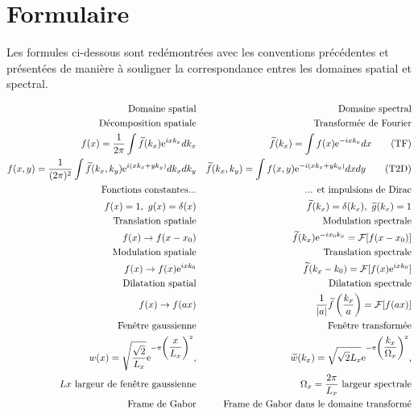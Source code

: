 \section{Formulaire}\label{formulaire}

Les formules ci-dessous sont redémontrées avec les conventions précédentes
et présentées de manière à souligner la correspondance entres les domaines spatial et spectral.
  
\begin{align}
\text{Domaine spatial}	&	&\text{Domaine spectral}
\nonumber\\
\text{Décomposition spatiale}	&	&	\text{Transformée de Fourier}
\nonumber\\
f(x) = \f[1]{2\pi}\Int\t{f}(k_x)\e^{ixk_x}dk_x	&	&	\t{f}(k_x) = \Int f(x)\e^{-ixk_x}dx
\tag{TF}\label{tf}\\
f(x,y) = \f[1]{(2\pi)^2}\Int\t{f}(k_x,k_y)\e^{i(xk_x+yk_y)}dk_xdk_y	&	&
\t{f}(k_x,k_y) = \Int f(x,y)\e^{-i(xk_x+yk_y)}dxdy
\tag{T2D}\label{tf2d}\\
\text{Fonctions constantes...}	&		&	\text{... et impulsions de Dirac}
\nonumber\\
f(x) = 1,\ g(x) = \delta(x)  &	&	\t{f}(k_x) = \delta(k_x),\ \t{g}(k_x) = 1
\label{t1}\\
\text{Translation spatiale}	&	&	\text{Modulation spectrale}
\nonumber\\
f(x) \rightarrow f(x-x_0)  &	&	\t{f}(k_x)\e^{-ix_0k_x}=\mathcal{F}[f(x-x_0)]
\label{translation}\\
\text{Modulation spatiale}	&	&	\text{Translation spectrale}
\nonumber\\
f(x) \rightarrow f(x)\e^{ixk_0}  &	&	\t{f}(k_x-k_0)=\mathcal{F}[f(x)\e^{ixk_0}]
\label{modulation}\\
\text{Dilatation spatial}	&	&	\text{Dilatation spectrale}
\nonumber\\
f(x) \rightarrow f(ax)  &	&	\f[1]{|a|}\t{f}\lc\f[k_x]{a}\rc =\mathcal{F}[f(ax)]
\label{dilatation}\\
\text{Fenêtre gaussienne}	&	&	\text{Fenêtre transformée}
\nonumber\\
w(x)=\r{\f[\r{2}]{L_x}}\e^{-\pi\lc\f[x]{L_x}\rc^2},  &	&	
\t{w}(k_x)=\r{\r{2}L_x}\e^{-\pi\lc\f[k_x]{\Omega_x}\rc^2},
\nonumber\\
Lx\text{ largeur de fenêtre gaussienne}	&	&	\Omega_x =\f[2\pi]{L_x}\text{ largeur spectrale}
\nonumber\\
\text{Frame de Gabor}	&	&	\text{Frame de Gabor dans le domaine transformé}
\nonumber\\

\end{align}
